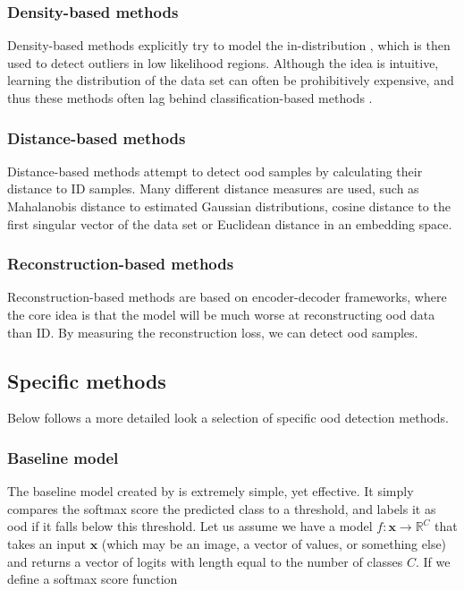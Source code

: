 \documentclass[UKenglish]{uiomasterthesis} %
\newcommand{\R}{\mathbb{R}}
\theoremstyle{definition}
\begin{document}
\subsubsection{Density-based methods}

Density-based methods explicitly try to model the in-distribution \cite{oodoverview}, which is then used to detect outliers in low likelihood regions. Although the idea is intuitive, learning the distribution of the data set can often be prohibitively expensive, and thus these methods often lag behind classification-based methods \cite{oodoverview}.
\\

\subsubsection{Distance-based methods} \label{section:distancebasedood}

Distance-based methods attempt to detect \ac{ood} samples by calculating their distance to ID samples. Many different distance measures are used, such as Mahalanobis distance to estimated Gaussian distributions, cosine distance to the first singular vector of the data set or Euclidean distance in an embedding space.
\\

\subsubsection{Reconstruction-based methods}

Reconstruction-based methods are based on encoder-decoder frameworks, where the core idea is that the model will be much worse at reconstructing \ac{ood} data than ID. By measuring the reconstruction loss, we can detect \ac{ood} samples.
\\

\subsection{Specific methods} \label{ood_specific}

Below follows a more detailed look a selection of specific \ac{ood} detection methods.

\subsubsection{Baseline model} \label{ood_baseline}

The baseline model created by \cite{oodbaseline} is extremely simple, yet effective. It simply compares the softmax score the predicted class to a threshold, and labels it as \ac{ood} if it falls below this threshold. Let us assume we have a model $f: \bm{x} \rightarrow \R^C$ that takes an input $\bm{x}$ (which may be an image, a vector of values, or something else) and returns a vector of logits with length equal to the number of classes $C$. If we define a softmax score function 
\end{document}
